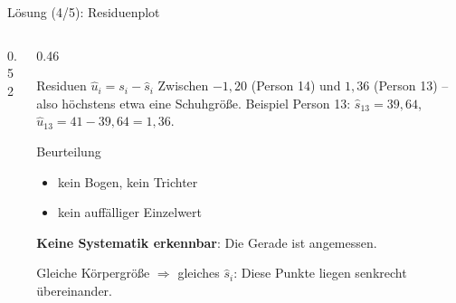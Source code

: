 \documentclass[aspectratio=169,11pt]{beamer}
\def\koerperresliste{38.7557/0.2443,38.3113/-0.3113,39.6445/-0.6445,46.3105/-0.3105,39.2001/0.7999,39.2001/-0.2001,44.9773/0.0227,37.8669/-0.8669,35.8671/0.1329,41.1999/0.8001,42.3109/0.6891,37.8669/0.1331,39.6445/1.3555,41.1999/-1.1999,39.6445/-0.6445}
\newcommand{\residuenplotvon}[2]{%
  \foreach \px/\py in #1 {%
    \edef\tmpdraw{\noexpand\draw[resred!70, line width=1.2pt, #2] (axis cs:\px,0) -- (axis cs:\px,\py);
      \noexpand\fill[hsbiblue, #2] (axis cs:\px,\py) circle[radius=2.2pt];}%
    \tmpdraw
  }}
\begin{document}
\begin{frame}{Lösung (4/5): Residuenplot}
  \begin{columns}[T]
    \begin{column}{0.52\textwidth}
    \end{column}
    \begin{column}{0.46\textwidth}
      \small
      \begin{block}{Residuen $\hat{u}_i = s_i - \hat{s}_i$}
        Zwischen $-1{,}20$ (Person 14) und $1{,}36$ (Person 13) -- also höchstens
        etwa eine Schuhgröße. Beispiel Person 13: $\hat{s}_{13} = 39{,}64$,
        $\hat{u}_{13} = 41 - 39{,}64 = 1{,}36$.
      \end{block}
      \begin{exampleblock}{Beurteilung}
        \begin{itemize}
          \item kein Bogen, kein Trichter
          \item kein auffälliger Einzelwert
        \end{itemize}
        \textbf{Keine Systematik erkennbar}: Die Gerade ist angemessen.
      \end{exampleblock}
      \footnotesize Gleiche Körpergröße $\Rightarrow$ gleiches $\hat{s}_i$: Diese
      Punkte liegen senkrecht übereinander.
    \end{column}
  \end{columns}
\end{frame}
\end{document}
